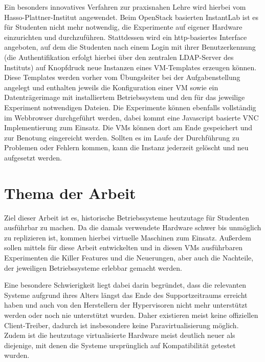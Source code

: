 		Ein besonders innovatives Verfahren zur praxisnahen Lehre wird hierbei vom Hasso-Plattner-Institut angewendet.
		Beim OpenStack basierten InstantLab ist es für Studenten nicht mehr notwendig, die Experimente auf eigener Hardware einzurichten und durchzuführen.
		Stattdessen wird ein http-basiertes Interface angeboten, auf dem die Studenten nach einem Login mit ihrer Benutzerkennung (die Authentifikation erfolgt hierbei über den zentralen LDAP-Server des Instituts) auf Knopfdruck neue Instanzen eines VM-Templates erzeugen können. 
		Diese Templates werden vorher vom Übungsleiter bei der Aufgabenstellung angelegt und enthalten jeweils die Konfiguration einer VM sowie ein Datenträgerimage mit installiertem Betriebssystem und den für das jeweilige Experiment notwendigen Dateien.
		Die Experimente können ebenfalls vollständig im Webbrowser durchgeführt werden, dabei kommt eine Javascript basierte VNC Implementierung zum Einsatz.
		Die VMs können dort am Ende gespeichert und zur Benotung eingereicht werden.
		Sollten es im Laufe der Durchführung zu Problemen oder Fehlern kommen, kann die Instanz jederzeit gelöscht und neu aufgesetzt werden.

\section{Thema der Arbeit}
\label{sec:topic}
			


		Ziel dieser Arbeit ist es, historische Betriebssysteme heutzutage für Studenten ausführbar zu machen.
		Da die damals verwendete Hardware schwer bis unmöglich zu replizieren ist, kommen hierbei virtuelle Maschinen zum Einsatz.
		Außerdem sollen mittels für diese Arbeit entwickelten und in diesen VMs ausführbaren Experimenten die Killer Features und die Neuerungen, aber auch die Nachteile, der jeweiligen Betriebssysteme erlebbar gemacht werden.
		
		Eine besondere Schwierigkeit liegt dabei darin begründet, dass die relevanten Systeme aufgrund ihres Alters längst das Ende des Supportzeitraums erreicht haben und auch von den Herstellern der Hypervisoren nicht mehr unterstützt werden oder noch nie unterstützt wurden.
		Daher existieren meist keine offiziellen Client-Treiber, dadurch ist insbesondere keine Paravirtualisierung möglich.
		Zudem ist die heutzutage virtualisierte Hardware meist deutlich neuer als diejenige, mit denen die Systeme ursprünglich auf Kompatibilität getestet wurden.

